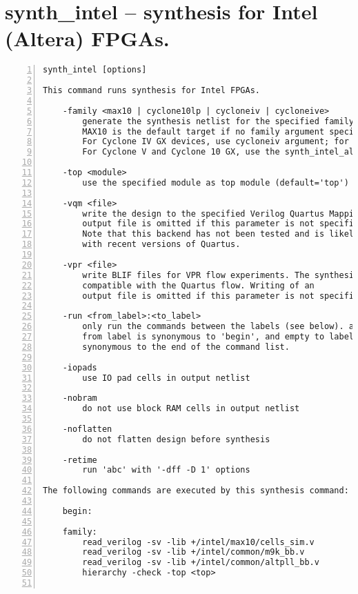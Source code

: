 \section{synth\_intel -- synthesis for Intel (Altera) FPGAs.}
\label{cmd:synth_intel}
\begin{lstlisting}[numbers=left,frame=single]
    synth_intel [options]

This command runs synthesis for Intel FPGAs.

    -family <max10 | cyclone10lp | cycloneiv | cycloneive>
        generate the synthesis netlist for the specified family.
        MAX10 is the default target if no family argument specified.
        For Cyclone IV GX devices, use cycloneiv argument; for Cyclone IV E, use cycloneive.
        For Cyclone V and Cyclone 10 GX, use the synth_intel_alm backend instead.

    -top <module>
        use the specified module as top module (default='top')

    -vqm <file>
        write the design to the specified Verilog Quartus Mapping File. Writing of an
        output file is omitted if this parameter is not specified.
        Note that this backend has not been tested and is likely incompatible
        with recent versions of Quartus.

    -vpr <file>
        write BLIF files for VPR flow experiments. The synthesized BLIF output file is not
        compatible with the Quartus flow. Writing of an
        output file is omitted if this parameter is not specified.

    -run <from_label>:<to_label>
        only run the commands between the labels (see below). an empty
        from label is synonymous to 'begin', and empty to label is
        synonymous to the end of the command list.

    -iopads
        use IO pad cells in output netlist

    -nobram
        do not use block RAM cells in output netlist

    -noflatten
        do not flatten design before synthesis

    -retime
        run 'abc' with '-dff -D 1' options

The following commands are executed by this synthesis command:

    begin:

    family:
        read_verilog -sv -lib +/intel/max10/cells_sim.v
        read_verilog -sv -lib +/intel/common/m9k_bb.v
        read_verilog -sv -lib +/intel/common/altpll_bb.v
        hierarchy -check -top <top>


\end{lstlisting}
